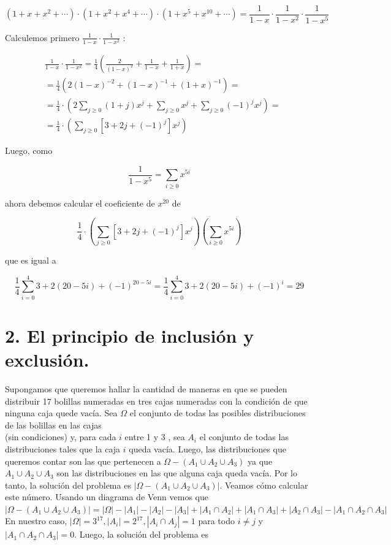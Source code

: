 \documentclass[10pt]{article}
\begin{document}
$$
\left(1+x+x^{2}+\cdots\right) \cdot\left(1+x^{2}+x^{4}+\cdots\right) \cdot\left(1+x^{5}+x^{10}+\cdots\right)=\frac{1}{1-x} \cdot \frac{1}{1-x^{2}} \cdot \frac{1}{1-x^{5}}
$$

Calculemos primero $\frac{1}{1-x} \cdot \frac{1}{1-x^{2}}$ :

$$
\begin{aligned}
& \frac{1}{1-x} \cdot \frac{1}{1-x^{2}}=\frac{1}{4}\left(\frac{2}{(1-x)^{2}}+\frac{1}{1-x}+\frac{1}{1+x}\right)= \\
& =\frac{1}{4}\left(2(1-x)^{-2}+(1-x)^{-1}+(1+x)^{-1}\right)= \\
& =\frac{1}{4} \cdot\left(2 \sum_{j \geq 0}(1+j) x^{j}+\sum_{j \geq 0} x^{j}+\sum_{j \geq 0}(-1)^{j} x^{j}\right)= \\
& =\frac{1}{4} \cdot\left(\sum_{j \geq 0}\left[3+2 j+(-1)^{j}\right] x^{j}\right)
\end{aligned}
$$

Luego, como

$$
\frac{1}{1-x^{5}}=\sum_{i \geq 0} x^{5 i}
$$

ahora debemos calcular el coeficiente de $x^{20}$ de

$$
\frac{1}{4} \cdot\left(\sum_{j \geq 0}\left[3+2 j+(-1)^{j}\right] x^{j}\right)\left(\sum_{i \geq 0} x^{5 i}\right)
$$

que es igual a

$$
\frac{1}{4} \sum_{i=0}^{4} 3+2(20-5 i)+(-1)^{20-5 i}=\frac{1}{4} \sum_{i=0}^{4} 3+2(20-5 i)+(-1)^{i}=29
$$

\section*{2. El principio de inclusión y exclusión.}
Supongamos que queremos hallar la cantidad de maneras en que se pueden distribuir 17 bolillas numeradas en tres cajas numeradas con la condición de que ninguna caja quede vacía. Sea $\Omega$ el conjunto de todas las posibles distribuciones de las bolillas en las cajas\\
(sin condiciones) y, para cada $i$ entre 1 y 3 , sea $A_{i}$ el conjunto de todas las distribuciones tales que la caja $i$ queda vacía. Luego, las distribuciones que queremos contar son las que pertenecen a $\Omega-\left(A_{1} \cup A_{2} \cup A_{3}\right)$ ya que $A_{1} \cup A_{2} \cup A_{3}$ son las distribuciones en las que alguna caja queda vacía. Por lo tanto, la solución del problema es $\left|\Omega-\left(A_{1} \cup A_{2} \cup A_{3}\right)\right|$. Veamos cómo calcular este número. Usando un diagrama de Venn vemos que\\
$\left|\Omega-\left(A_{1} \cup A_{2} \cup A_{3}\right)\right|=|\Omega|-\left|A_{1}\right|-\left|A_{2}\right|-\left|A_{3}\right|+\left|A_{1} \cap A_{2}\right|+\left|A_{1} \cap A_{3}\right|+\left|A_{2} \cap A_{3}\right|-\left|A_{1} \cap A_{2} \cap A_{3}\right|$\\
En nuestro caso, $|\Omega|=3^{17},\left|A_{i}\right|=2^{17},\left|A_{i} \cap A_{j}\right|=1$ para todo $i \neq j$ y $\left|A_{1} \cap A_{2} \cap A_{3}\right|=0$. Luego, la solución del problema es
\end{document}
